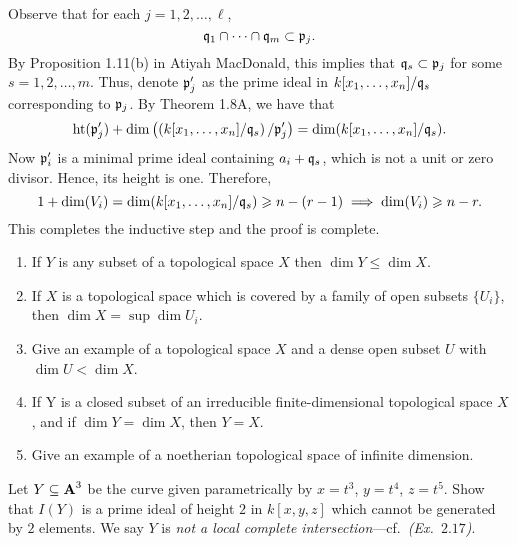 \documentclass[10pt]{amsart}
\begin{document}
\begin{solution}
{\begin{description}
        Observe that for each $j = 1, 2, \dots, {\ell}$, 
        \[
            \idl{q}_1 \cap \cdots \cap \idl{q}_{m} \subset \idl{p}_j.
        \]
        By Proposition 1.11(b) in Atiyah MacDonald, this implies that 
        $\idl{q}_s \subset \idl{p}_j$ for some $s = 1, 2, \dots, m$. 
        Thus, denote $\idl{p}'_j$ as the prime ideal in $k[\xs]/\idl{q}_s$ 
        corresponding to $\idl{p}_j$. 
        By Theorem 1.8A, we have that 
        \[
            \Ht(\idl{p}'_j) + \Dim\left( \left(k[\xs]/\idl{q}_s\right)/\idl{p}'_j \right)
            =
            \Dim(k[\xs]/\idl{q}_s).
        \]
        Now $\idl{p}'_i$ is a minimal prime ideal containing $a_i + \idl{q}_s$, which is not a unit
        or zero divisor. Hence, its height is one. Therefore, 
        \[
            1 + \Dim(V_i) = \Dim(k[\xs]/\idl{q}_s) \ge n - (r - 1)
            \implies 
            \Dim(V_i) \ge n - r.
        \]
        This completes the inductive step and the proof is complete. 
    \end{description}}
\end{solution}

\begin{exercise}[1.10]
    \begin{enumerate}
        \item If $Y$ is any subset of a topological space $X$ then $\dim Y \leq \dim X$. 
        \item If $X$ is a topological space which is covered by a family of open
          subsets $\{U_{i}\}$, then $\dim X = \sup \dim U_i$.
        \item Give an example of a topological space $X$ and a dense open subset $U$
          with $\dim U < \dim X$. 
        \item If Y is a closed subset of an irreducible finite-dimensional topological space $X$, and if $\dim Y = \dim X$, then $Y= X$. 
        \item Give an example of a noetherian topological space of infinite dimension.  
    \end{enumerate}
\end{exercise}

\begin{solution}
    
\end{solution}

\begin{exercise}[1.11]
    Let $Y \subseteq \aa^3$ be the curve given parametrically by
    $x = t^3$, $y= t^4$, $z = t^5$.
    Show that $I(Y)$ is a prime ideal of height $2$ in $k[x,y,z]$ which cannot
    be generated by $2$ elements.
    We say $Y$ is \emph{not a local complete
    intersection}---cf.~\emph{(Ex.~$2.17$)}. 
\end{exercise}
\end{document}
